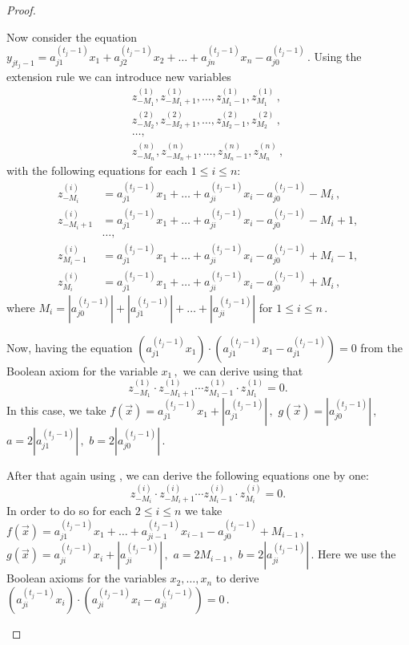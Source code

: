 \documentclass{toc}
\begin{document}
\begin{proof}
\begin{itemize}
Now consider the equation %
$y_{j t_{j} - 1} = a_{j 1}^{(t_j - 1)}x_1 + a_{j 2}^{(t_j - 1)}x_2 + \ldots + a_{j n}^{(t_j - 1)}x_n - a_{j 0}^{(t_j - 1)}\,.$ %
 Using the extension rule we can introduce new variables
\begin{align*}
z_{-M_1}^{(1)}, z_{-M_1 + 1}^{(1)}, \ldots, z_{M_1 - 1}^{(1)}, z_{M_1}^{(1)}\,, \\
z_{-M_2}^{(2)}, z_{-M_2 + 1}^{(2)}, \ldots, z_{M_2 - 1}^{(2)}, z_{M_2}^{(2)}\,, \\
\ldots, \\
z_{-M_n}^{(n)}, z_{-M_n + 1}^{(n)}, \ldots, z_{M_n - 1}^{(n)}, z_{M_n}^{(n)}\,, 
\end{align*}
with the following equations for each $1 \le i \le n$:
\begin{align*}
%
%
%
z_{-M_i}^{(i)} &= a_{j 1}^{(t_j - 1)}x_1  + \ldots + a_{j i}^{(t_j - 1)}x_i - a_{j 0}^{(t_j - 1)} - M_i\,, \\
z_{-M_i + 1}^{(i)} &= a_{j 1}^{(t_j - 1)}x_1  + \ldots + a_{j i}^{(t_j - 1)}x_i - a_{j 0}^{(t_j - 1)} - M_i + 1, \\
&\ldots, \\
z_{M_i - 1}^{(i)} &=  a_{j 1}^{(t_j - 1)}x_1  + \ldots + a_{j i}^{(t_j - 1)}x_i - a_{j 0}^{(t_j - 1)} + M_i - 1, \\
z_{M_i}^{(i)} &=  a_{j 1}^{(t_j - 1)}x_1  + \ldots + a_{j i}^{(t_j - 1)}x_i - a_{j 0}^{(t_j - 1)} + M_i\,,
\end{align*}
%
where $M_i = |a_{j 0}^{(t_j - 1)}| + |a_{j 1}^{(t_j - 1)}| + \ldots + |a_{j i}^{(t_j - 1)}|$ for %
$1 \le i \le n\,.$ %
%

Now, having the equation $(a_{j1}^{(t_j - 1)} x_1) \cdot  (a_{j1}^{(t_j - 1)} x_1 - a_{j1}^{(t_j - 1)}) = 0$ from the Boolean axiom for the variable %
$x_1\,,$ %
 we can derive using  that
$$
z_{-M_1}^{(1)} \cdot z_{-M_1 + 1}^{(1)}  \cdots z_{M_1 - 1}^{(1)} \cdot z_{M_1}^{(1)} = 0.
$$
In this case, we take %
$f(\vec x) = a_{j1}^{(t_j - 1)} x_1 + |a_{j1}^{(t_j - 1)}|\,,$ %
$g(\vec x) = |a_{j0}^{(t_j - 1)}|\,,$ %
$a = 2 |a_{j1}^{(t_j - 1)}|\,,$ %
$b =  2 |a_{j0}^{(t_j - 1)}|\,.$ %

After that again using , we can derive the following equations one by one:
$$
z_{-M_i}^{(i)} \cdot z_{-M_i + 1}^{(i)}  \cdots z_{M_i - 1}^{(i)} \cdot z_{M_i}^{(i)} = 0.
$$
In order to do so for each $2 \le i \le n$ we take %
$f(\vec x) = a_{j 1}^{(t_j - 1)}x_1  + \ldots + a_{j i - 1}^{(t_j - 1)}x_{i - 1} - a_{j 0}^{(t_j - 1)} + M_{i - 1}\,,$ %
$g(\vec x) = a_{ji}^{(t_j - 1)}x_i + |a_{ji}^{(t_j - 1)}|\,,$ %
$a = 2 M_{i - 1}\,,$ %
$b =  2 |a_{ji}^{(t_j - 1)}|\,.$ %
 Here we use the Boolean axioms for the variables $x_2, \ldots, x_n$ to derive %
$(a_{ji}^{(t_j - 1)} x_i) \cdot  (a_{ji}^{(t_j - 1)} x_i - a_{ji}^{(t_j - 1)}) = 0\,.$ %


\end{itemize}
\end{proof}
\end{document}
